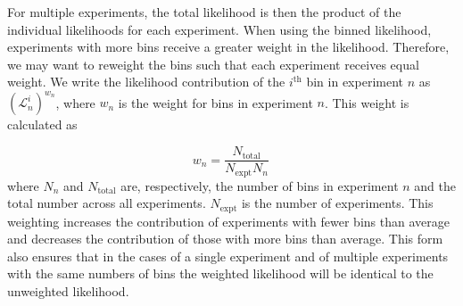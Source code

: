 For multiple experiments, the total likelihood is then the product of the individual likelihoods for each experiment. When using the binned likelihood, experiments with more bins receive a greater weight in the likelihood. Therefore, we may want to reweight the bins such that each experiment receives equal weight. We write the likelihood contribution of the $i^\textrm{th}$ bin in experiment $n$ as $(\mathcal{L}_n^i)^{w_n}$, where $w_n$ is the weight for bins in experiment $n$. This weight is calculated as

\begin{equation}
w_n = \frac{N_\textrm{total}}{N_\textrm{expt}N_n}\,
\end{equation}
where $N_n$ and $N_\textrm{total}$ are, respectively, the number of bins in experiment $n$ and the total number across all experiments. $N_\textrm{expt}$ is the number of experiments. This weighting increases the contribution of experiments with fewer bins than average and decreases the contribution of those with more bins than average. This form also ensures that in the cases of a single experiment and of multiple experiments with the same numbers of bins the weighted likelihood will be identical to the unweighted likelihood.




